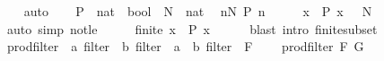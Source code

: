 \begin{isabellebody}
\ \ \isamarkupfalse%
\ auto\isanewline
{}\isamarkupfalse%
\isanewline
\ \ \isamarkupfalse%
\ P\ {\isacharcolon}{\kern0pt}{\isacharcolon}{\kern0pt}\ {\isachardoublequoteopen}nat\ {\isasymRightarrow}\ bool{\isachardoublequoteclose}\ \ N\ {\isacharcolon}{\kern0pt}{\isacharcolon}{\kern0pt}\ nat\ \isamarkupfalse%
\ {\isachardoublequoteopen}{\isasymforall}n{\isasymge}N{\isachardot}{\kern0pt}\ P\ n{\isachardoublequoteclose}\isanewline
\ \ \isamarkupfalse%
\ \isamarkupfalse%
\ {\isachardoublequoteopen}{\isacharbraceleft}{\kern0pt}x{\isachardot}{\kern0pt}\ {\isasymnot}\ P\ x{\isacharbraceright}{\kern0pt}\ {\isasymsubseteq}\ {\isacharbraceleft}{\kern0pt}{\isachardot}{\kern0pt}{\isachardot}{\kern0pt}{\isacharless}{\kern0pt}\ N{\isacharbraceright}{\kern0pt}{\isachardoublequoteclose}\isanewline
\ \ \ \ \isamarkupfalse%
\ {\isacharparenleft}{\kern0pt}auto\ simp{\isacharcolon}{\kern0pt}\ not{\isacharunderscore}{\kern0pt}le{\isacharparenright}{\kern0pt}\isanewline
\ \ \isamarkupfalse%
\ \isamarkupfalse%
\ {\isachardoublequoteopen}finite\ {\isacharbraceleft}{\kern0pt}x{\isachardot}{\kern0pt}\ {\isasymnot}\ P\ x{\isacharbraceright}{\kern0pt}{\isachardoublequoteclose}\isanewline
\ \ \ \ \isamarkupfalse%
\ {\isacharparenleft}{\kern0pt}blast\ intro{\isacharcolon}{\kern0pt}\ finite{\isacharunderscore}{\kern0pt}subset{\isacharparenright}{\kern0pt}\isanewline
{}\isamarkupfalse%
%
\endisatagproof
{\isafoldproof}%
%
\isadelimproof
%
\endisadelimproof
%
\isadelimdocument
%
\endisadelimdocument
%
\isatagdocument
%
\isamarkuptrue%
%
\endisatagdocument
{\isafolddocument}%
%
\isadelimdocument
%
\endisadelimdocument
{}\isamarkupfalse%
\ prod{\isacharunderscore}{\kern0pt}filter\ {\isacharcolon}{\kern0pt}{\isacharcolon}{\kern0pt}\ {\isachardoublequoteopen}{\isacharprime}{\kern0pt}a\ filter\ {\isasymRightarrow}\ {\isacharprime}{\kern0pt}b\ filter\ {\isasymRightarrow}\ {\isacharparenleft}{\kern0pt}{\isacharprime}{\kern0pt}a\ {\isasymtimes}\ {\isacharprime}{\kern0pt}b{\isacharparenright}{\kern0pt}\ filter{\isachardoublequoteclose}\ {\isacharparenleft}{\kern0pt}\ {\isachardoublequoteopen}{\isasymtimes}\isactrlsub F{\isachardoublequoteclose}\ {}{}{\isacharparenright}{\kern0pt}\ \isanewline
\ \ {\isachardoublequoteopen}prod{\isacharunderscore}{\kern0pt}filter\ F\ G\ {\isacharequal}{\kern0pt}\isanewline

\end{isabellebody}
